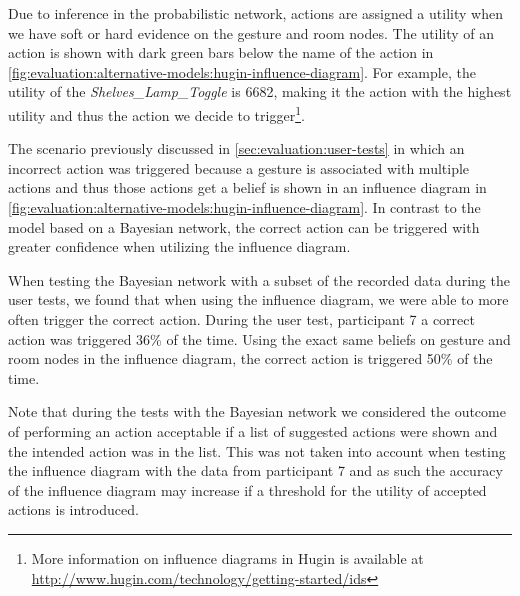 Due to inference in the probabilistic network, actions are assigned a utility when we have soft or hard evidence on the gesture and room nodes. The utility of an action is shown with dark green bars below the name of the action in \cref{fig:evaluation:alternative-models:hugin-influence-diagram}. For example, the utility of the \emph{Shelves\_Lamp\_Toggle} is 6682, making it the action with the highest utility and thus the action we decide to trigger\footnote{More information on influence diagrams in Hugin is available at \url{http://www.hugin.com/technology/getting-started/ids}}.

The scenario previously discussed in \cref{sec:evaluation:user-tests} in which an incorrect action was triggered because a gesture is associated with multiple actions and thus those actions get a belief is shown in an influence diagram in \cref{fig:evaluation:alternative-models:hugin-influence-diagram}. In contrast to the model based on a Bayesian network, the correct action can be triggered with greater confidence when utilizing the influence diagram.

When testing the Bayesian network with a subset of the recorded data during the user tests, we found that when using the influence diagram, we were able to more often trigger the correct action. During the user test, participant 7 a correct action was triggered 36\% of the time. Using the exact same beliefs on gesture and room nodes in the influence diagram, the correct action is triggered 50\% of the time.

Note that during the tests with the Bayesian network we considered the outcome of performing an action acceptable if a list of suggested actions were shown and the intended action was in the list. This was not taken into account when testing the influence diagram with the data from participant 7 and as such the accuracy of the influence diagram may increase if a threshold for the utility of accepted actions is introduced.

